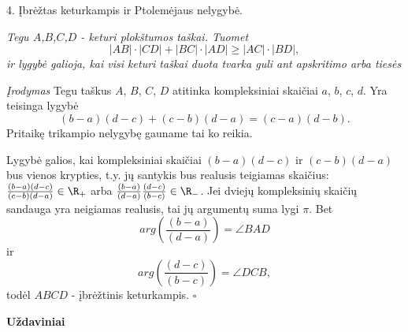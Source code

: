 4. Įbrėžtas keturkampis ir Ptolemėjaus nelygybė. 

{\it Tegu $A$,$B$,$C$,$D$ - keturi plokštumos taškai. Tuomet $$|AB|\cdot |CD| + |BC|\cdot |AD| \geq |AC|\cdot |BD|,$$ ir lygybė galioja, kai visi keturi taškai duota tvarka guli ant apskritimo arba tiesės}
\smallskip

{\it Įrodymas} Tegu taškus $A$, $B$, $C$, $D$ atitinka kompleksiniai skaičiai $a$, $b$, $c$, $d$. Yra teisinga lygybė
$$(b-a)(d-c) + (c-b)(d-a) = (c-a)(d-b).$$ Pritaikę trikampio nelygybę gauname tai ko reikia.

\smallskip

Lygybė galios, kai kompleksiniai skaičiai $(b-a)(d-c)$ ir $(c-b)(d-a)$ bus vienos krypties, t.y. jų santykis bus realusis teigiamas skaičius: $\frac{(b-a)(d-c)}{(c-b)(d-a)}\in \R_{+}$ arba $\frac{(b-a)}{(d-a)}\frac{(d-c)}{(b-c)} \in \R_{-}$. Jei dviejų kompleksinių skaičių sandauga yra neigiamas realusis, tai jų argumentų suma lygi $\pi$. Bet $$arg\left(\frac{(b-a)}{(d-a)}\right) = \angle BAD$$ ir $$arg\left(\frac{(d-c)}{(b-c)}\right) = \angle DCB,$$ todėl $ABCD$ - įbrėžtinis keturkampis. $\square$



\begin{center}\textbf{Uždaviniai}\end{center}


